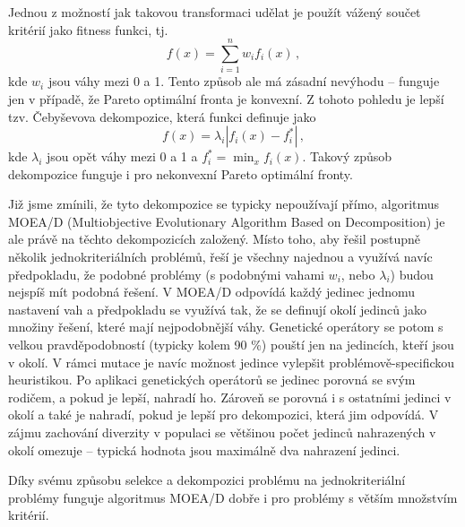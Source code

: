 Jednou z možností jak takovou transformaci udělat je použít vážený součet kritérií jako fitness funkci, tj. $$f(x) = \sum_{i=1}^n w_if_i(x)\,,$$ kde $w_i$ jsou váhy mezi 0 a 1. Tento způsob ale má zásadní nevýhodu -- funguje jen v případě, že Pareto optimální fronta je konvexní. Z tohoto pohledu je lepší tzv. Čebyševova dekompozice, která funkci definuje jako $$f(x) = \lambda_i|f_i(x) - f^*_i|\,,$$ kde $\lambda_i$ jsou opět váhy mezi 0 a 1 a $f^*_i = \min_x f_i(x)$. Takový způsob dekompozice funguje i pro nekonvexní Pareto optimální fronty.

Již jsme zmínili, že tyto dekompozice se typicky nepoužívají přímo, algoritmus MOEA/D (Multiobjective Evolutionary Algorithm Based on Decomposition) je ale právě na těchto dekompozicích založený. Místo toho, aby řešil postupně několik jednokriteriálních problémů, řeší je všechny najednou a využívá navíc předpokladu, že podobné problémy (s podobnými vahami $w_i$, nebo $\lambda_i$) budou nejspíš mít podobná řešení. V MOEA/D odpovídá každý jedinec jednomu nastavení vah a předpokladu se využívá tak, že se definují okolí jedinců jako množiny řešení, které mají nejpodobnější váhy. Genetické operátory se potom s velkou pravděpodobností (typicky kolem 90 \%) pouští jen na jedincích, kteří jsou v okolí. V rámci mutace je navíc možnost jedince vylepšit problémově-specifickou heuristikou. Po aplikaci genetických operátorů se jedinec porovná se svým rodičem, a pokud je lepší, nahradí ho. Zároveň se porovná i s ostatními jedinci v okolí a také je nahradí, pokud je lepší pro dekompozici, která jim odpovídá. V zájmu zachování diverzity v populaci se většinou počet jedinců nahrazených v okolí omezuje -- typická hodnota jsou maximálně dva nahrazení jedinci.

Díky svému způsobu selekce a dekompozici problému na jednokriteriální problémy funguje algoritmus MOEA/D dobře i pro problémy s větším množstvím kritérií.